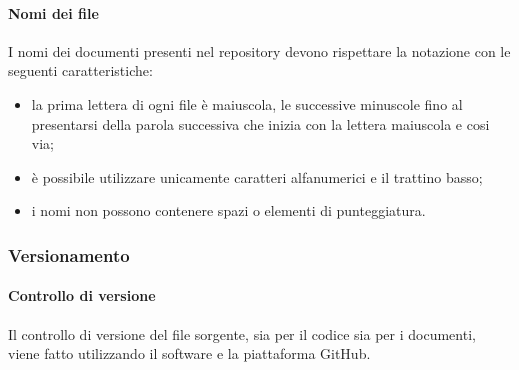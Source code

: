   \paragraph{Nomi dei file}
  I nomi dei documenti presenti nel repository devono rispettare la notazione  con le seguenti caratteristiche:
  \begin{itemize}
  	\item la prima lettera di ogni file è maiuscola, le successive minuscole fino al presentarsi della parola successiva che inizia con la lettera maiuscola e cosi via;
  	\item è possibile utilizzare unicamente caratteri alfanumerici e il trattino basso;
  	\item i nomi non possono contenere spazi o elementi di punteggiatura.
  \end{itemize}

  \subsubsection{Versionamento}\label{sec:versionamento}
	  \paragraph{Controllo di versione}
	  Il controllo di versione del file sorgente, sia per il codice sia per i documenti, viene fatto utilizzando il software  e la piattaforma GitHub. 
